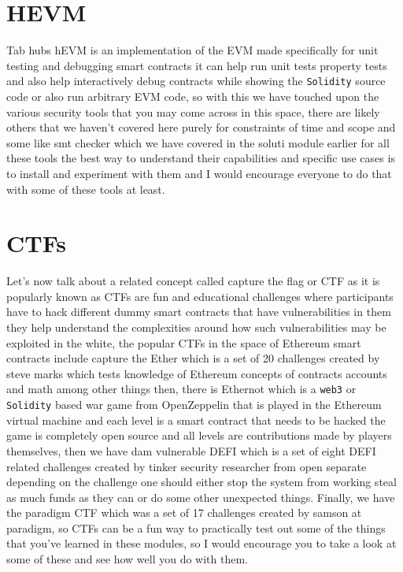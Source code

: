 \section{HEVM}

Tab hubs hEVM is an implementation of the EVM made specifically for unit testing and debugging smart contracts it can help run unit tests property tests and also help interactively debug contracts while showing the \verb|Solidity| source code or also run arbitrary EVM code, so with this we have touched upon the various security tools that you may come across in this space, there are likely others that we haven't covered here purely for constraints of time and scope and some like smt checker which we have covered in the soluti module earlier for all these tools the best way to understand their capabilities and specific use cases is to install and experiment with them and I would encourage everyone to do that with some of these tools at least.

\section{CTFs}

Let's now talk about a related concept called capture the flag or CTF as it is popularly known as CTFs are fun and educational challenges where participants have to hack different dummy smart contracts that have vulnerabilities in them they help understand the complexities around how such vulnerabilities may be exploited in the white, the popular CTFs in the space of Ethereum smart contracts include capture the Ether which is a set of 20 challenges created by steve marks which tests knowledge of Ethereum concepts of contracts accounts and math among other things then, there is Ethernot which is a \verb|web3| or \verb|Solidity| based war game from OpenZeppelin that is played in the Ethereum virtual machine and each level is a smart contract that needs to be hacked the game is completely open source and all levels are contributions made by players themselves, then we have dam vulnerable DEFI which is a set of eight DEFI related challenges created by tinker security researcher from open separate depending on the challenge one should either stop the system from working steal as much funds as they can or do some other unexpected things. Finally, we have the paradigm CTF which was a set of 17 challenges created by samson at paradigm, so CTFs can be a fun way to practically test out some of the things that you've learned in these modules, so I would encourage you to take a look at some of these and see how well you do with them.

